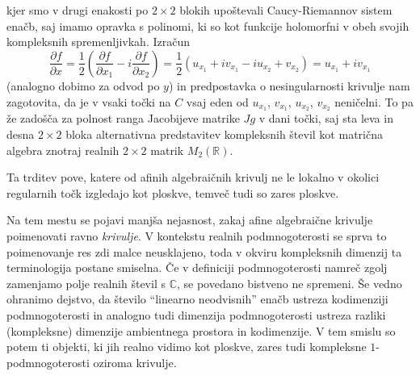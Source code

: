 \documentclass[mat1]{fmfdelo}
\newcommand{\R}{\mathbb R}
\newcommand{\C}{\mathbb C}
\newcommand{\pdv}[2][]{\frac{\partial#1}{\partial#2}}
\theoremstyle{definition}
\begin{document}
\begin{dokaz}
    \\  
    \\ 

    kjer smo v drugi enakosti po $2 \times 2$ blokih upoštevali Caucy-Riemannov sistem enačb, saj imamo opravka s polinomi, ki so kot funkcije holomorfni v obeh svojih kompleksnih spremenljivkah. Izračun
    \[
        \pdv[f]{x} = \frac{1}{2} \left( \pdv[f]{x_1} - i\pdv[f]{x_2}\right) = \frac{1}{2} \left( u_{x_1} + i v_{x_1} - i u_{x_2} + v_{x_2}\right) = u_{x_1} + iv_{x_1}
    \]
    (analogno dobimo za odvod po $y$) in predpostavka o nesingularnosti krivulje nam zagotovita, da je v vsaki točki na $C$ vsaj eden od $u_{x_1}$, $v_{x_1}$, $u_{x_2}$, $v_{x_2}$ neničelni. To pa že zadošča za polnost ranga Jacobijeve matrike $Jg$ v dani točki, saj sta leva in desna $2 \times 2$ bloka alternativna predstavitev kompleksnih števil kot matrična algebra znotraj realnih $2 \times2$ matrik $M_2(\R)$.  

\end{dokaz}

Ta trditev pove, katere od afinih algebraičnih krivulj ne le lokalno v okolici regularnih točk izgledajo kot ploskve, temveč tudi so zares ploskve. 
\\
\par
Na tem mestu se pojavi manjša nejasnost, zakaj afine algebraične krivulje poimenovati ravno \emph{krivulje}. V kontekstu realnih podmnogoterosti se sprva to poimenovanje res zdi malce neusklajeno, toda v okviru kompleksnih dimenzij ta terminologija postane smiselna. Če v definiciji podmnogoterosti namreč zgolj zamenjamo polje realnih števil s $\C$, se povedano bistveno ne spremeni. Še vedno ohranimo dejstvo, da število ``linearno neodvisnih'' enačb ustreza kodimenziji podmnogoterosti in analogno tudi dimenzija podmnogoterosti ustreza razliki (kompleksne) dimenzije ambientnega prostora in kodimenzije. V tem smislu so potem ti objekti, ki jih realno vidimo kot ploskve, zares tudi kompleksne $1$-podmnogoterosti oziroma krivulje.
\end{document}
